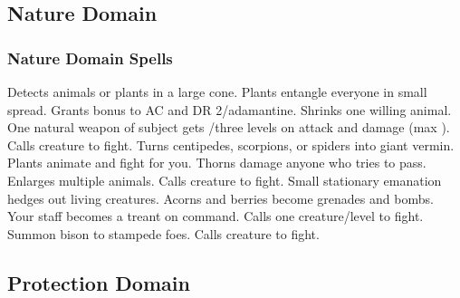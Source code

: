 \subsection{Nature Domain}

\subsubsection{Nature Domain Spells}
\begin{spelllist}
   Detects animals or plants in a large cone.
   Plants entangle everyone in small spread.
   Grants  bonus to AC and DR 2/adamantine.
   Shrinks one willing animal.
   One natural weapon of subject gets /three levels on attack and damage (max ).
   Calls creature to fight.
   Turns centipedes, scorpions, or spiders into giant vermin.
  \spellhead[4]{}
   Plants animate and fight for you.
   Thorns damage anyone who tries to pass.
   Enlarges multiple animals.
   Calls creature to fight.
   Small stationary emanation hedges out living creatures.
   Acorns and berries become grenades and bombs.
   Your staff becomes a treant on command.
   Calls one creature/level to fight.
   Summon bison to stampede foes.
   Calls creature to fight.
\end{spelllist}

\subsection{Protection Domain}

